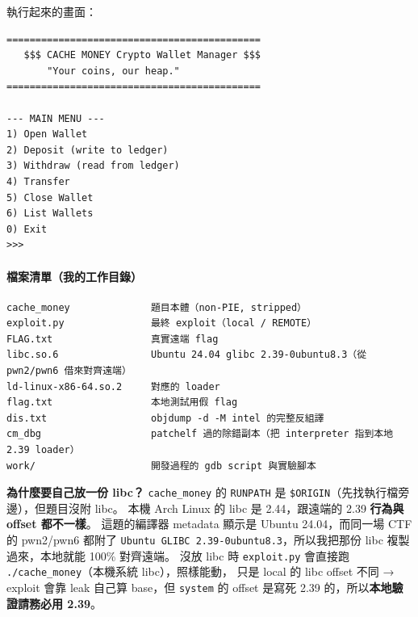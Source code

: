 \documentclass[10pt,a4paper]{article}
\renewenvironment{quote}{%
  \begin{mdframed}[linewidth=0pt,innerleftmargin=0pt,innerrightmargin=0pt,
    innerbottommargin=0pt,innertopmargin=0pt,skipabove=0.55em,skipbelow=0.55em,
    leftmargin=0.9em,rightmargin=0.4em,startcode={\color{quotebar}\vrule width 2.6pt},%
    endcode={}]%
  \itshape\color{black}%
}{%
  \end{mdframed}%
}
\begin{document}
執行起來的畫面：

\begin{Verbatim}[breaklines=true,breakanywhere=true,breakautoindent=false,fontsize=\fontsize{7.0}{9.5}\selectfont]
============================================
   $$$ CACHE MONEY Crypto Wallet Manager $$$
       "Your coins, our heap."
============================================

--- MAIN MENU ---
1) Open Wallet
2) Deposit (write to ledger)
3) Withdraw (read from ledger)
4) Transfer
5) Close Wallet
6) List Wallets
0) Exit
>>>
\end{Verbatim}

\paragraph{檔案清單（我的工作目錄）}\label{ux6a94ux6848ux6e05ux55aeux6211ux7684ux5de5ux4f5cux76eeux9304}

\begin{Verbatim}[breaklines=true,breakanywhere=true,breakautoindent=false,fontsize=\fontsize{7.0}{9.5}\selectfont]
cache_money              題目本體（non-PIE, stripped）
exploit.py               最終 exploit（local / REMOTE）
FLAG.txt                 真實遠端 flag
libc.so.6                Ubuntu 24.04 glibc 2.39-0ubuntu8.3（從 pwn2/pwn6 借來對齊遠端）
ld-linux-x86-64.so.2     對應的 loader
flag.txt                 本地測試用假 flag
dis.txt                  objdump -d -M intel 的完整反組譯
cm_dbg                   patchelf 過的除錯副本（把 interpreter 指到本地 2.39 loader）
work/                    開發過程的 gdb script 與實驗腳本
\end{Verbatim}

\begin{quote}
\textbf{為什麼要自己放一份 libc？} \texttt{cache\_\allowbreak{}money} 的
\texttt{RUNPATH} 是 \texttt{\$\allowbreak{}ORIGIN}（先找執行檔旁邊），但題目沒附
libc。 本機 Arch Linux 的 libc 是 2.44，跟遠端的 2.39 \textbf{行為與
offset 都不一樣}。 這題的編譯器 metadata 顯示是 Ubuntu 24.04，而同一場
CTF 的 pwn2/pwn6 都附了
\texttt{Ubuntu\ \allowbreak{}GLIBC\ \allowbreak{}2.\allowbreak{}39-\allowbreak{}0ubuntu8.\allowbreak{}3}，所以我把那份 libc
複製過來，本地就能 100\% 對齊遠端。 沒放 libc 時 \texttt{exploit.\allowbreak{}py}
會直接跑 \texttt{./\allowbreak{}cache\_\allowbreak{}money}（本機系統 libc），照樣能動， 只是 local
的 libc offset 不同 → exploit 會靠 leak 自己算 base，但 \texttt{system}
的 offset 是寫死 2.39 的，所以\textbf{本地驗證請務必用 2.39}。
\end{quote}
\end{document}
